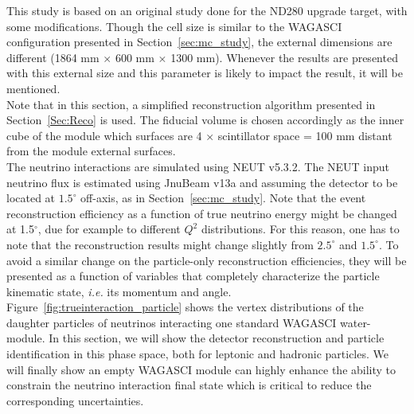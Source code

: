 This study is based on an original study done for the ND280 upgrade target, with some modifications. Though the cell size is similar to the WAGASCI configuration presented in Section~\ref{sec:mc_study}, the external dimensions are different (1864 mm $\times$ 600 mm $\times$ 1300 mm). Whenever the results are presented with this external size and this parameter is likely to impact the result, it will be mentioned.\\
Note that in this section, a simplified reconstruction algorithm presented in Section~\ref{Sec:Reco} is used. 
The fiducial volume is chosen accordingly as the inner cube of the module which 
surfaces are  4 × scintillator space = 100 mm distant from the module external surfaces.\\
The neutrino interactions are simulated using NEUT v5.3.2. The NEUT input neutrino flux is estimated using JnuBeam v13a and assuming the detector to be located at $1.5^{\circ}$ off-axis, as in Section~\ref{sec:mc_study}. Note that the event reconstruction efficiency as a function of true neutrino energy might be changed at 1.5$^{\circ}$, due for example to different $Q^{2}$ distributions. For this reason, one has to note that the reconstruction 
results might change slightly from  $2.5^{\circ}$ and $1.5^{\circ}$. To avoid a similar change on the particle-only reconstruction efficiencies, they will be presented as a function of variables that completely characterize the particle kinematic state, \textit{i.e.} its momentum and angle. Figure~\ref{fig:trueinteraction_particle} shows 
the vertex distributions
 of the daughter particles of neutrinos interacting one standard WAGASCI water-module. In this section, we will show the detector reconstruction and particle identification in this phase space, both for leptonic and hadronic particles. We will finally show an empty WAGASCI module can highly enhance the ability to constrain the neutrino interaction final state which is critical to reduce the corresponding uncertainties.

